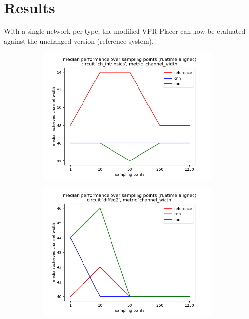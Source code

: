\section{Results}

With a single network per type, the modified \gls{VPR} Placer can now be evaluated against the unchanged version (reference system).

\begin{figure}
	\centering
	\begin{subfigure}[b]{0.49\linewidth}
		\includegraphics[width=\linewidth]{plots/eval-ch_intrinsics-chan-width-median-full.png}
	\end{subfigure}
	\begin{subfigure}[b]{0.49\linewidth}
		\includegraphics[width=\linewidth]{plots/eval-diffeq2-chan-width-median-full.png}

\end{subfigure}
\end{figure}
